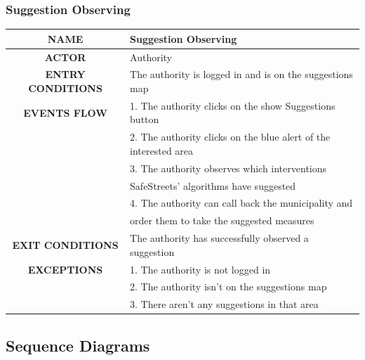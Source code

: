 \documentclass[12pt,a4paper]{article}
\begin{document}
\subsubsection{Suggestion Observing}
\begin{center}
			\begin{tabular}{| c | l |}
				\hline
				\textbf{NAME} & Suggestion Observing\\
				\hline
				\textbf{ACTOR} & Authority \\
				\hline
				\textbf{ENTRY CONDITIONS} & The authority is logged in and is on the suggestions map\\
				\hline
				\textbf{EVENTS FLOW}  &
				1. The authority clicks on the show Suggestions button\\
				&2. The authority clicks on the blue alert of the interested area\\ 
				&3. The authority observes which interventions \\
				& 	SafeStreets' algorithms have suggested \\
				&4. The authority can call back the municipality and \\
				& order them to take the suggested measures\\
				\hline
				\textbf{EXIT CONDITIONS} & The authority has successfully observed a suggestion \\ 
				\hline
				\textbf{EXCEPTIONS} &
				1. The authority is not logged in\\
				&2. The authority isn't on the suggestions map\\
				&3. There aren't any suggestions in that area\\
				\hline
			\end{tabular}
		\end{center}
\subsection{Sequence Diagrams}
\end{document}
